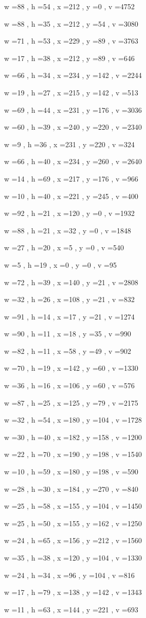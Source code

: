 \documentclass[11pt]{article}
\begin{document}
w =88 , h =54 , x =212 , y =0 , v =4752
\par
w =88 , h =35 , x =212 , y =54 , v =3080
\par
w =71 , h =53 , x =229 , y =89 , v =3763
\par
w =17 , h =38 , x =212 , y =89 , v =646
\par
w =66 , h =34 , x =234 , y =142 , v =2244
\par
w =19 , h =27 , x =215 , y =142 , v =513
\par
w =69 , h =44 , x =231 , y =176 , v =3036
\par
w =60 , h =39 , x =240 , y =220 , v =2340
\par
w =9 , h =36 , x =231 , y =220 , v =324
\par
w =66 , h =40 , x =234 , y =260 , v =2640
\par
w =14 , h =69 , x =217 , y =176 , v =966
\par
w =10 , h =40 , x =221 , y =245 , v =400
\par
w =92 , h =21 , x =120 , y =0 , v =1932
\par
w =88 , h =21 , x =32 , y =0 , v =1848
\par
w =27 , h =20 , x =5 , y =0 , v =540
\par
w =5 , h =19 , x =0 , y =0 , v =95
\par
w =72 , h =39 , x =140 , y =21 , v =2808
\par
w =32 , h =26 , x =108 , y =21 , v =832
\par
w =91 , h =14 , x =17 , y =21 , v =1274
\par
w =90 , h =11 , x =18 , y =35 , v =990
\par
w =82 , h =11 , x =58 , y =49 , v =902
\par
w =70 , h =19 , x =142 , y =60 , v =1330
\par
w =36 , h =16 , x =106 , y =60 , v =576
\par
w =87 , h =25 , x =125 , y =79 , v =2175
\par
w =32 , h =54 , x =180 , y =104 , v =1728
\par
w =30 , h =40 , x =182 , y =158 , v =1200
\par
w =22 , h =70 , x =190 , y =198 , v =1540
\par
w =10 , h =59 , x =180 , y =198 , v =590
\par
w =28 , h =30 , x =184 , y =270 , v =840
\par
w =25 , h =58 , x =155 , y =104 , v =1450
\par
w =25 , h =50 , x =155 , y =162 , v =1250
\par
w =24 , h =65 , x =156 , y =212 , v =1560
\par
w =35 , h =38 , x =120 , y =104 , v =1330
\par
w =24 , h =34 , x =96 , y =104 , v =816
\par
w =17 , h =79 , x =138 , y =142 , v =1343
\par
w =11 , h =63 , x =144 , y =221 , v =693
\par
\newpage
\end{document}
